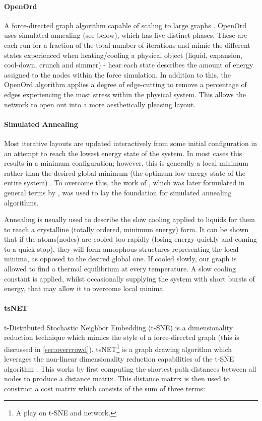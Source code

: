\paragraph{OpenOrd}
A force-directed graph algorithm capable of scaling to large graphs \citep{openord}. OpenOrd uses simulated annealing (see below), which has five distinct phases. These are each run for a fraction of the total number of iterations and mimic the different states experienced when heating/cooling a physical object (liquid, expansion, cool-down, crunch and simmer) - hear each state describes the amount of energy assigned to the nodes within the force simulation. In addition to this, the OpenOrd algorithm applies a degree of edge-cutting to remove a percentage of edges experiencing the most stress within the physical system. This allows the network to open out into a more aesthetically pleasing layout.


\paragraph*{Simulated Annealing}
Most iterative layouts are updated interactively from some initial configuration in an attempt to reach the lowest energy state of the system. In most cases this results in a minimum configuration; however, this is generally a local minimum rather than the desired global minimum (the optimum low energy state of the entire system) \citep{nicelyanneal}. To overcome this, the work of \cite{metropolis}, which was later formulated in general terms by \citep{kirkpatrick}, was used to lay the foundation for simulated annealing algorithms.

Annealing is usually used to describe the slow cooling applied to liquids for them to reach a crystalline (totally ordered, minimum energy) form. It can be shown that if the atoms(nodes) are cooled too rapidly (losing energy quickly and coming to a quick stop), they will form amorphous structures representing the local minima, as opposed to the desired global one.  If cooled slowly, our graph is allowed to find a thermal equilibrium at every temperature. A slow cooling constant is applied, whilst occasionally supplying the system with short bursts of energy, that may allow it to overcome local minima.


\paragraph{tsNET}
t-Distributed Stochastic Neighbor Embedding (t-SNE) is a dimensionality reduction technique which mimics the style of a force-directed graph (this is discussed in \autoref{sec:overcrowd}). tsNET\footnote{A play on t-SNE and network.} is a graph drawing algorithm which leverages the non-linear dimensionality reduction capabilities of the t-SNE algorithm \citep{tsne}. This works by first computing the shortest-path distances between all nodes to produce a distance matrix. This distance matrix is then used to construct a cost matrix which consists of the sum of three terms:

